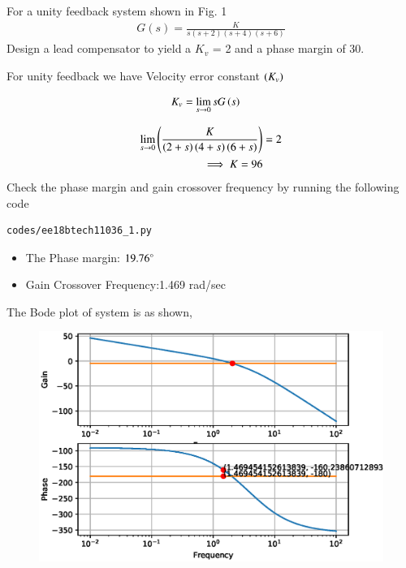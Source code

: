 
\item For a unity feedback system shown in Fig. 1
\begin{align}
G(s) =\frac{K}{s(s+2)(s+4)(s+6)}
\label{eq:ee18btech11036_system1}
\end{align}
Design a lead compensator to yield a $K_v$ = 2 and a phase margin of 30\degree.
\begin{figure}[!ht]
	\centering
	\resizebox{\columnwidth}{!}{}
\caption{}
\label{fig:ee18btech11036}
\end{figure}

\solution 
For unity feedback we have Velocity error constant $\left(K_v\right)$

\begin{align}
K_v &= \lim_{s \to 0} s G\left(s\right) 
\label{eq:ee18btech11036_Kv}
\end{align}

\begin{align}
\lim_{s \to 0} \left(\frac{K}{\left(2+s\right)\left(4+s\right)\left(6+s\right)} \right)& = 2 
\\
\implies K = 96
\label{eq:ee18btech11036_init_cond}
\end{align}
Check the phase margin and gain crossover frequency by running the following code
\begin{lstlisting}
codes/ee18btech11036_1.py
\end{lstlisting}
\begin{itemize}
    \item The Phase margin: $19.76\degree$
    \item Gain Crossover Frequency:1.469  rad/sec
\end{itemize}
The Bode plot of system is as shown,
\begin{figure}[!ht]
  \centering
  \includegraphics[width=\columnwidth]{./figs/ee18btech11036_1.eps}
  \caption{}
  \label{fig:ee18btech11036_1}
\end{figure}

